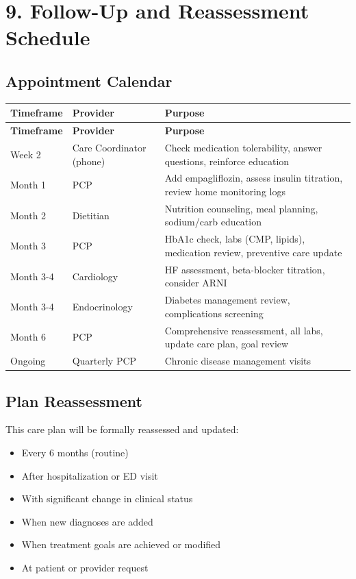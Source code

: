 \documentclass[11pt,letterpaper]{article}
\begin{document}
\section*{9. Follow-Up and Reassessment Schedule}

\subsection*{Appointment Calendar}

\begin{longtable}{|l|l|p{7cm}|}
\hline
\textbf{Timeframe} & \textbf{Provider} & \textbf{Purpose} \\ \hline
\endfirsthead
\hline
\textbf{Timeframe} & \textbf{Provider} & \textbf{Purpose} \\ \hline
\endhead
Week 2 & Care Coordinator (phone) & Check medication tolerability, answer questions, reinforce education \\ \hline
Month 1 & PCP & Add empagliflozin, assess insulin titration, review home monitoring logs \\ \hline
Month 2 & Dietitian & Nutrition counseling, meal planning, sodium/carb education \\ \hline
Month 3 & PCP & HbA1c check, labs (CMP, lipids), medication review, preventive care update \\ \hline
Month 3-4 & Cardiology & HF assessment, beta-blocker titration, consider ARNI \\ \hline
Month 3-4 & Endocrinology & Diabetes management review, complications screening \\ \hline
Month 6 & PCP & Comprehensive reassessment, all labs, update care plan, goal review \\ \hline
Ongoing & Quarterly PCP & Chronic disease management visits \\ \hline
\end{longtable}

\subsection*{Plan Reassessment}

This care plan will be formally reassessed and updated:
\begin{itemize}[leftmargin=*]
    \item Every 6 months (routine)
    \item After hospitalization or ED visit
    \item With significant change in clinical status
    \item When new diagnoses are added
    \item When treatment goals are achieved or modified
    \item At patient or provider request
\end{itemize}
\end{document}
